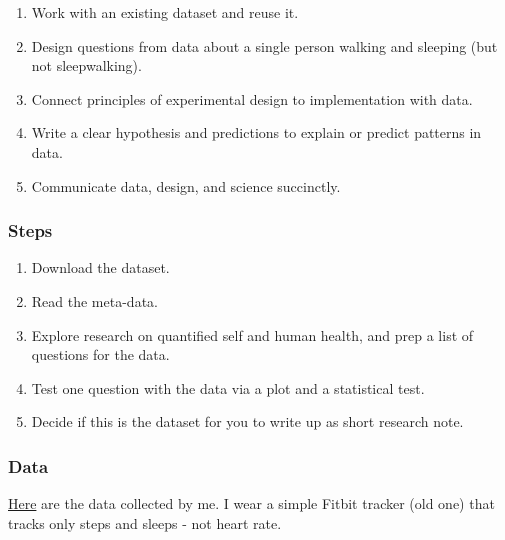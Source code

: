 \documentclass[
]{book}
\providecommand{\tightlist}{%
  \setlength{\itemsep}{0pt}\setlength{\parskip}{0pt}}
\begin{document}
\begin{enumerate}
\def\labelenumi{\arabic{enumi}.}
\tightlist
\item
  Work with an existing dataset and reuse it.\\
\item
  Design questions from data about a single person walking and sleeping (but not sleepwalking).\\
\item
  Connect principles of experimental design to implementation with data.\\
\item
  Write a clear hypothesis and predictions to explain or predict patterns in data.\\
\item
  Communicate data, design, and science succinctly.
\end{enumerate}

\hypertarget{steps-5}{%
\subsubsection*{Steps}\label{steps-5}}

\begin{enumerate}
\def\labelenumi{\arabic{enumi}.}
\tightlist
\item
  Download the dataset.\\
\item
  Read the meta-data.\\
\item
  Explore research on quantified self and human health, and prep a list of questions for the data.
\item
  Test one question with the data via a plot and a statistical test.\\
\item
  Decide if this is the dataset for you to write up as short research note.
\end{enumerate}

\hypertarget{data-5}{%
\subsubsection*{Data}\label{data-5}}

\href{https://figshare.com/articles/dataset/Quantified_life/12803105}{Here} are the data collected by me. I wear a simple Fitbit tracker (old one) that tracks only steps and sleeps - not heart rate.
\end{document}
